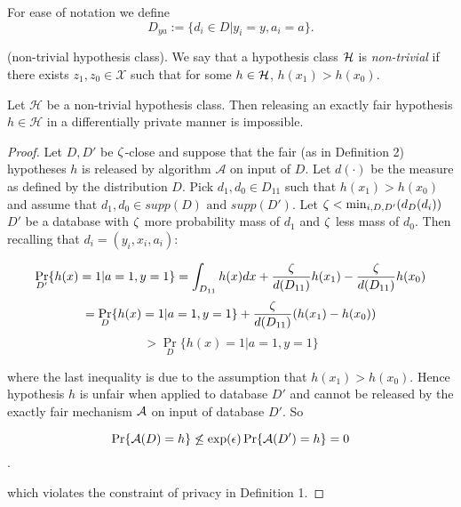 \begin{defn}
	For ease of notation we define
	$$D_{ya} := \{d_i \in D | y_i = y, a_i = a \}.$$
\end{defn}
\begin{defn}
	(non-trivial hypothesis class). We say that a hypothesis class $\mathcal{H}$ is  \emph{non-trivial} if there exists $z_1, z_0 \in \mathcal{X}$ such that for some $h \in \mathcal{H}$, $h(x_1) > h(x_0)$.
\end{defn}
\begin{lemma}Let $\mathcal{H}$ be a non-trivial hypothesis class. Then
  releasing an exactly fair hypothesis $h\in \mathcal{H}$ in a
  differentially private manner is impossible.
\end{lemma}

\begin{proof}
	Let $D, D'$ be $\zeta$-close and suppose that the fair (as in
  Definition 2) hypotheses $h$ is released by algorithm $\mathcal{A}$
  on input of $D$. Let $d(\cdot)$ be the measure as defined by the
  distribution $D$. Pick $d_1, d_0 \in D_{11}$ such that $h(x_1) >
  h(x_0)$ and assume that $d_1, d_0 \in supp(D) \text{ and } supp(D')$.
  Let $\zeta < \min_{i,D,D'}(d_{D}(d_i))$ $D'$ be a database with $\zeta$
  more probability mass of $d_1$ and $\zeta$ less mass of $d_0$. Then
  recalling that $d_i = (y_i, x_i, a_i)$:

$$\Pr_{D'}\{h(x) = 1 | a = 1, y=1\} = \int_{D_{11}}h(x)dx +
\frac{\zeta}{d(D_{11})} h(x_1) - \frac{\zeta}{d(D_{11})} h(x_0) $$
$$= \Pr_{D}\{h(x) = 1 | a = 1, y=1\} + \frac{\zeta}{d(D_{11})} (h(x_1) - h(x_0))$$
$$>  \Pr_{D}\{h(x) = 1 | a = 1, y=1\}$$

where the last inequality is due to the assumption that $h(x_1) >
h(x_0)$. Hence hypothesis $h$ is unfair when applied to database $D'$
and cannot be released by the exactly fair mechanism $\mathcal{A}$ on input of
database $D'$. So

$$\Pr\{\mathcal{A}(D) = h\} \not\leq \exp(\epsilon)\Pr\{\mathcal{A}(D') = h\} = 0$$.

which violates the constraint of privacy in Definition 1.
\end{proof}

